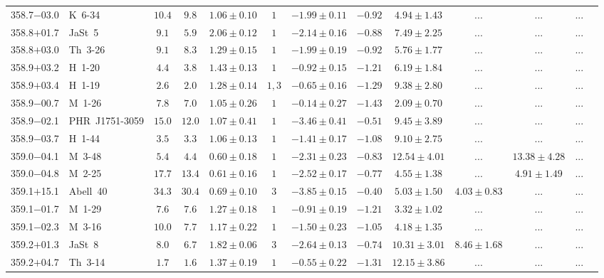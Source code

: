 \documentclass[useAMS]{mn2e}
\begin{document}
\begin{center}
{\begin{longtable}{llccccccccccc}
358.7$-$03.0&K~6-34&$      10.4$&$       9.8$&$1.06 \pm 0.10$&$1$&$-1.99 \pm 0.11$&$     -0.92$&$4.94 \pm 1.43$&$...$&$...$&...\\
358.8$+$01.7&JaSt~5&$       9.1$&$       5.9$&$2.06 \pm 0.12$&$1$&$-2.14 \pm 0.16$&$     -0.88$&$7.49 \pm 2.25$&$...$&$...$&...\\
358.8$+$03.0&Th~3-26&$       9.1$&$       8.3$&$1.29 \pm 0.15$&$1$&$-1.99 \pm 0.19$&$     -0.92$&$5.76 \pm 1.77$&$...$&$...$&...\\
358.9$+$03.2&H~1-20&$       4.4$&$       3.8$&$1.43 \pm 0.13$&$1$&$-0.92 \pm 0.15$&$     -1.21$&$6.19 \pm 1.84$&$...$&$...$&...\\
358.9$+$03.4&H~1-19&$       2.6$&$       2.0$&$1.28 \pm 0.14$&$1,3$&$-0.65 \pm 0.16$&$     -1.29$&$9.38 \pm 2.80$&$...$&$...$&...\\
358.9$-$00.7&M~1-26&$       7.8$&$       7.0$&$1.05 \pm 0.26$&$1$&$-0.14 \pm 0.27$&$     -1.43$&$2.09 \pm 0.70$&$...$&$...$&...\\
358.9$-$02.1&PHR~J1751-3059&$      15.0$&$      12.0$&$1.07 \pm 0.41$&$1$&$-3.46 \pm 0.41$&$     -0.51$&$9.45 \pm 3.89$&$...$&$...$&...\\
358.9$-$03.7&H~1-44&$       3.5$&$       3.3$&$1.06 \pm 0.13$&$1$&$-1.41 \pm 0.17$&$     -1.08$&$9.10 \pm 2.75$&$...$&$...$&...\\
359.0$-$04.1&M~3-48&$       5.4$&$       4.4$&$0.60 \pm 0.18$&$1$&$-2.31 \pm 0.23$&$     -0.83$&$12.54 \pm 4.01$&$...$&$13.38 \pm 4.28$&...\\
359.0$-$04.8&M~2-25&$      17.7$&$      13.4$&$0.61 \pm 0.16$&$1$&$-2.52 \pm 0.17$&$     -0.77$&$4.55 \pm 1.38$&$...$&$4.91 \pm 1.49$&...\\
359.1$+$15.1&Abell~40&$      34.3$&$      30.4$&$0.69 \pm 0.10$&$3$&$-3.85 \pm 0.15$&$     -0.40$&$5.03 \pm 1.50$&$4.03 \pm 0.83$&$...$&...\\
359.1$-$01.7&M~1-29&$       7.6$&$       7.6$&$1.27 \pm 0.18$&$1$&$-0.91 \pm 0.19$&$     -1.21$&$3.32 \pm 1.02$&$...$&$...$&...\\
359.1$-$02.3&M~3-16&$      10.0$&$       7.7$&$1.17 \pm 0.22$&$1$&$-1.50 \pm 0.23$&$     -1.05$&$4.18 \pm 1.35$&$...$&$...$&...\\
359.2$+$01.3&JaSt~8&$       8.0$&$       6.7$&$1.82 \pm 0.06$&$3$&$-2.64 \pm 0.13$&$     -0.74$&$10.31 \pm 3.01$&$8.46 \pm 1.68$&$...$&...\\
359.2$+$04.7&Th~3-14&$       1.7$&$       1.6$&$1.37 \pm 0.19$&$1$&$-0.55 \pm 0.22$&$     -1.31$&$12.15 \pm 3.86$&$...$&$...$&...\\

\end{longtable}}
\end{center}
\end{document}
